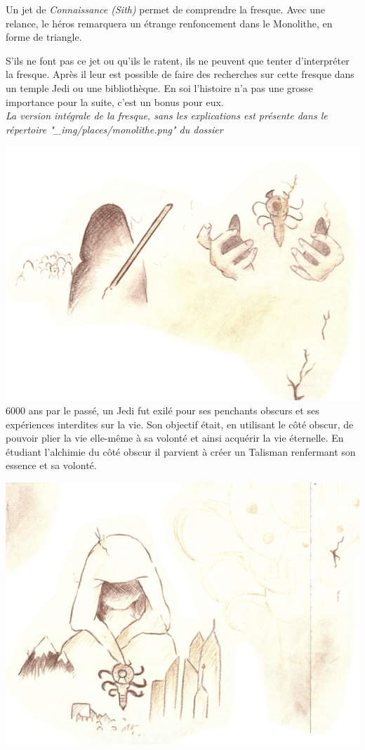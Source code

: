 Un jet de \textit{Connaissance (Sith)} permet de comprendre la fresque. Avec une relance, le héros remarquera un étrange renfoncement dans le Monolithe, en forme de triangle.

S’ils ne font pas ce jet ou qu’ils le ratent, ils ne peuvent que tenter d’interpréter la fresque. Après il leur est possible de faire des recherches sur cette fresque dans un temple Jedi ou une bibliothèque. En soi l’histoire n’a pas une grosse importance pour la suite, c’est un bonus pour eux.
\\

\textit{La version intégrale de la fresque, sans les explications est présente dans le répertoire "\_img/places/monolithe.png" du dossier}

\clearpage

\begin{quotebox}
\noindent\includegraphics[width=\linewidth]{_img/places/monolithe-001.png}
6000 ans par le passé, un Jedi fut exilé pour ses penchants obscurs et ses expériences interdites sur la vie. Son objectif était, en utilisant le côté obscur, de pouvoir plier la vie elle-même à sa volonté et ainsi acquérir la vie éternelle. En étudiant l’alchimie du côté obscur il parvient à créer un Talisman renfermant son essence et sa volonté. 

\noindent\includegraphics[width=\linewidth]{_img/places/monolithe-002.png}


\end{quotebox}
